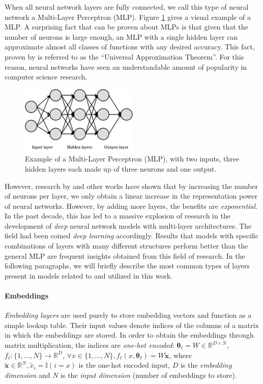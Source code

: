 When all neural network layers are fully connected, we call this type of neural network a Multi-Layer Perceptron (MLP). Figure \ref{fig:mlp_example} gives a visual example of a MLP. A surprising fact that can be proven about MLPs is that given that the number of neurons is large enough, an MLP with a single hidden layer can approximate almost all classes of functions with any desired accuracy. This fact, proven by \cite{hornik_multilayer_1989} is referred to as the \enquote{Universal Approximation Theorem}. For this reason, neural networks have seen an understandable amount of popularity in computer science research.

\begin{figure}[H]
\centering
\includegraphics[width=0.5\textwidth]{figures/background/mlp_example}
\caption[Example of a Multi-Layer Perceptron (MLP).]{Example of a Multi-Layer Perceptron (MLP), with two inputs, three hidden layers each made up of three neurons and one output.}
\label{fig:mlp_example}
\end{figure}

However, research by \cite{telgarsky_representation_2015, telgarsky_benefits_2016} and other works have shown that by increasing the number of neurons per layer, we only obtain a linear increase in the representation power of neural networks. However, by adding more layers, the benefits are \emph{exponential}. In the past decade, this has led to a massive explosion of research in the development of \emph{deep} neural network models with multi-layer architectures. The field had been coined \emph{deep learning} accordingly. Results that models with specific combinations of layers with many different structures perform better than the general MLP are frequent insights obtained from this field of research. In the following paragraphs, we will briefly describe the most common types of layers present in models related to and utilized in this work.

\paragraph{Embeddings} \emph{Embedding layers} are used purely to store embedding vectors and function as a simple lookup table. Their input values denote indices of the columns of a matrix in which the embeddings are stored. In order to obtain the embeddings through matrix multiplication, the indices are \emph{one-hot encoded}: $\pmb{\theta}_{\ell} = W \in \mathbb{R}^{D \times N}$, $f_{\ell}: \{1,\dots,N\} \to \mathbb{R}^D$, $\forall x \in \{1,\dots,N\}, f_{\ell}(x, \pmb{\theta}_{\ell}) = W \tilde{\pmb{x}}$, where $\tilde{\pmb{x}} \in \mathbb{R}^N, \tilde{x}_i = \mathbb{I}(i = x)$ is the one-hot encoded input, $D$ is the \emph{embedding dimension} and $N$ is the \emph{input dimension} (number of embeddings to store).

